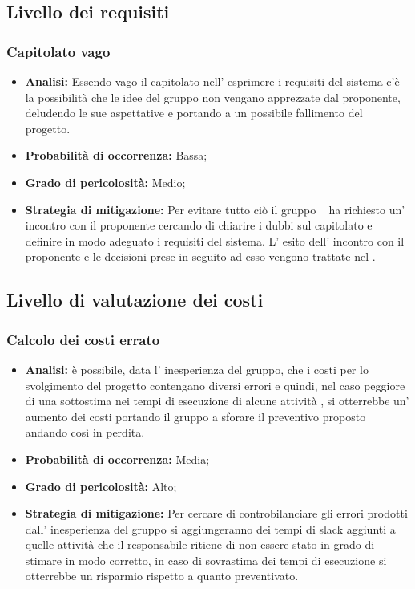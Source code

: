 \subsection{Livello dei requisiti}
\subsubsection{Capitolato vago}
	\begin{itemize}
	\item \textbf{Analisi: }Essendo vago il capitolato nell' esprimere i requisiti del sistema c'è la possibilità che le idee del gruppo non vengano apprezzate dal proponente, deludendo le sue aspettative e portando a un possibile fallimento del progetto.
	\item \textbf{Probabilità di occorrenza:} Bassa;
	\item \textbf{Grado di pericolosità:} Medio;
	\item \textbf{Strategia di mitigazione: }Per evitare tutto ciò il gruppo \gruppo~ ha richiesto un' incontro con il proponente cercando di chiarire i dubbi sul capitolato e definire in modo adeguato i requisiti del sistema. L' esito dell' incontro con il proponente e le decisioni prese in seguito ad esso vengono trattate nel \VerbaleB.
	\end{itemize}
\subsection{Livello di valutazione dei costi}
\subsubsection{Calcolo dei costi errato}
	\begin{itemize}
	\item \textbf{Analisi: }è possibile, data l' inesperienza del gruppo, che i costi per lo svolgimento del progetto contengano diversi errori e quindi, nel caso peggiore di una sottostima nei tempi di esecuzione di alcune attività , si otterrebbe un' aumento dei costi portando il gruppo a sforare il preventivo proposto andando così in perdita.
	\item \textbf{Probabilità di occorrenza:} Media;
	\item \textbf{Grado di pericolosità:} Alto;
	\item \textbf{Strategia di mitigazione: } Per cercare di controbilanciare gli errori prodotti dall' inesperienza del gruppo si aggiungeranno dei tempi di slack aggiunti a quelle attività che il responsabile ritiene di non essere stato in grado di stimare in modo corretto, in caso di sovrastima dei tempi di esecuzione si otterrebbe un risparmio rispetto a quanto preventivato.
	\end{itemize}